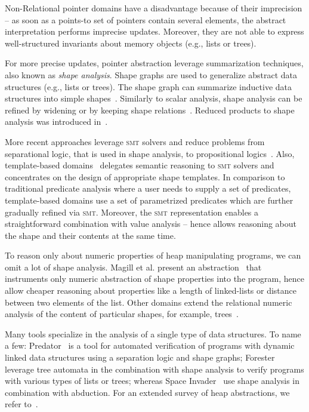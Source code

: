 Non-Relational pointer domains have a disadvantage because of their imprecision
-- as soon as a points-to set of pointers contain several elements, the
abstract interpretation performs imprecise updates. Moreover, they are not able
to express well-structured invariants about memory objects (e.g., lists or trees).

For more precise updates, pointer abstraction leverage summarization
techniques, also known as \emph{shape analysis}. Shape graphs are used to
generalize abstract data structures (e.g., lists or trees). The shape graph can
summarize inductive data structures into simple shapes~\cite{Distefano2006}.
Similarly to scalar analysis, shape analysis can be refined by widening or by
keeping shape relations~\cite{Chang2008}.  Reduced products to shape analysis
was introduced in~\cite{Toubhans2013}.

More recent approaches leverage \textsc{smt} solvers and reduce problems from
separational logic, that is used in shape analysis, to propositional
logics~\cite{Piskac2013, Itzhaky2014, Itzhaky2014b}.  Also, template-based
domains~\cite{Malik2018} delegates semantic reasoning to \textsc{smt} solvers
and concentrates on the design of appropriate shape templates.  In comparison
to traditional predicate analysis where a user needs to supply a set of
predicates, template-based domains use a set of parametrized predicates which
are further gradually refined via \textsc{smt}.  Moreover, the \textsc{smt}
representation enables a straightforward combination with value analysis --
hence allows reasoning about the shape and their contents at the same time.

To reason only about numeric properties of heap manipulating programs, we can
omit a lot of shape analysis. Magill et al. present an
abstraction~\cite{Magill2010} that instruments only numeric abstraction of
shape properties into the program, hence allow cheaper reasoning about
properties like a length of linked-lists or distance between two elements of
the list. Other domains extend the relational numeric analysis of the content
of particular shapes, for example, trees~\cite{Journault2019}.

Many tools specialize in the analysis of a single type of data structures. To
name a few: Predator~\cite{Dudka2012} is a tool for automated verification of programs with
dynamic linked data structures using a separation logic and shape
graphs; Forester~\cite{Holik2015} leverage tree automata in the combination
with shape analysis to verify programs with various types of lists or
trees; whereas Space Invader~\cite{Yang2008} use shape
analysis in combination with abduction. For an extended survey of heap
abstractions, we refer to~\cite{Kanvar2016}.

